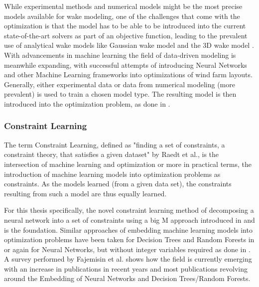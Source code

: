 While experimental methods and numerical models might be the most precise models available for wake modeling, one of the challenges that come with the optimization is that the model has to be able to be introduced into the current state-of-the-art solvers as part of an objective function, leading to the prevalent use of analytical wake models like Gaussian wake model and the 3D wake model  \cite{WANG2024118508}. With advancements in machine learning the field of data-driven modeling is meanwhile expanding, with successful attempts of introducing Neural Networks and other Machine Learning frameworks into optimizations of wind farm layouts. Generally, either experimental data or data from numerical modeling (more prevalent) is used to train  a chosen model type. The resulting model is then introduced into the optimization problem, as done in \cite{YANG2023119240} \cite{wes-9-869-2024} \cite{TI2020114025} \cite{TI2021618}. 

\subsubsection{Constraint Learning}

The term Constraint Learning, defined as "finding a set of constraints, a constraint theory, that satisfies a given dataset" by Raedt et al., is the intersection of machine learning and optimization or more in practical terms, the introduction of machine learning models into optimization problems as constraints. As the models learned (from a given data set), the constraints resulting from such a model are thus equally learned. \cite{de2018learning} 

For this thesis specifically, the novel constraint learning method of decomposing a neural network into a set of constraints using a big M approach introduced in \cite{ALCANTARA2023120895} and \cite{ALCANTARA2025127876} is the foundation. Similar approaches of embedding machine learning models into optimization problems have been taken for Decision Trees and Random Forests in \cite{preprintBonfiettiEmbeddDecisionTrees} or again for Neural Networks, but without integer variables required as done in \cite{dealba2024reformulationembeddingneuralnetwork}. A survey performed by Fajemisin et al.\cite{FAJEMISIN20241} shows how the field is currently emerging with an increase in publications in recent years and most publications revolving around the Embedding of Neural Networks and Decision Trees/Random Forests.
